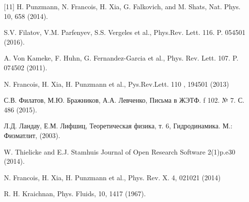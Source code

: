 \begin{thebibliography}{99}
[11] H. Punzmann, N. Francois, H. Xia, G. Falkovich, and M. Shats, Nat. Phys. 10, 658 (2014).



S.V. Filatov, V.M. Parfenyev, S.S. Vergeles et al., Phys.Rev. Lett. { 116}. P. 054501 (2016).

A. Von Kameke, F. Huhn, G. Fernandez-Garcia et al., Phys. Rev. Lett. { 107}. P. 074502 (2011).

N. Francois, H. Xia, H. Punzmann et al., Pys.Rev.Lett. { 110 }, 194501 (2013)

С.В. Филатов, М.Ю. Бражников, А.А. Левченко, Письма в ЖЭТФ. {f 102}. № 7. С. 486 (2015).

Л.Д. Ландау, Е.М. Лифшиц, Теоретическая физика, т. 6, Гидродинамика. М.: Физматлит, (2003).

W. Thielicke and E.J. Stamhuis Journal of Open Research Software 2(1)p.e30 (2014).

N. Francois, H. Xia, H. Punzmann et al., Phys. Rev. X. { 4}, 021021 (2014)

R. H. Kraichnan, Phys. Fluids, {10}, 1417 (1967).


\end{thebibliography}
